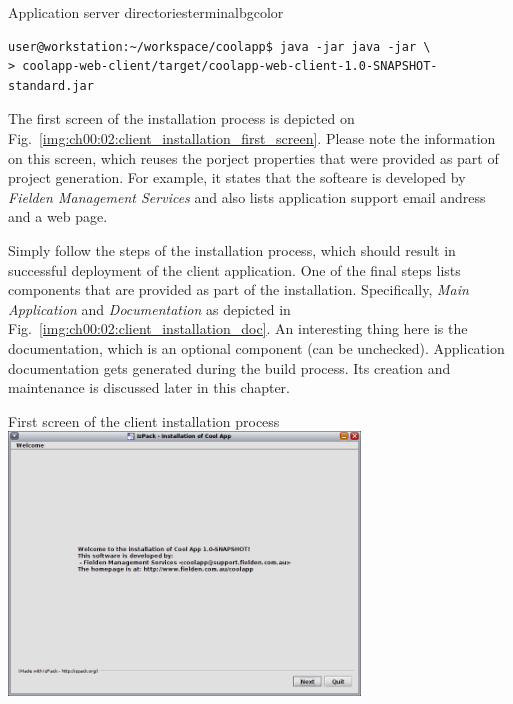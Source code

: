   \begin{code}{Application server directories}{\label{lst:install_client}}{terminalbgcolor}
     \begin{lstlisting}
user@workstation:~/workspace/coolapp$ java -jar java -jar \
> coolapp-web-client/target/coolapp-web-client-1.0-SNAPSHOT-standard.jar
     \end{lstlisting}
  \end{code}

  The first screen of the installation process is depicted on Fig.~\ref{img:ch00:02:client_installation_first_screen}.
  Please note the information on this screen, which reuses the porject properties that were provided as part of project generation.
  For example, it states that the softeare is developed by \emph{Fielden Management Services} and also lists application support email andress and a web page.
  
  Simply follow the steps of the installation process, which should result in successful deployment of the client application.
  One of the final steps lists components that are provided as part of the installation.
  Specifically, \emph{Main Application} and \emph{Documentation} as depicted in Fig.~\ref{img:ch00:02:client_installation_doc}.
  An interesting thing here is the documentation, which is an optional component (can be unchecked).
  Application documentation gets generated during the build process.
  Its creation and maintenance is discussed later in this chapter.

  \begin{image}{First screen of the client installation process}{\label{img:ch00:02:client_installation_first_screen}}    
    \includegraphics[width=0.7\textwidth]{parts/00-part/chapters/01-application-modules/images/01-client-installation.png}
  \end{image}

